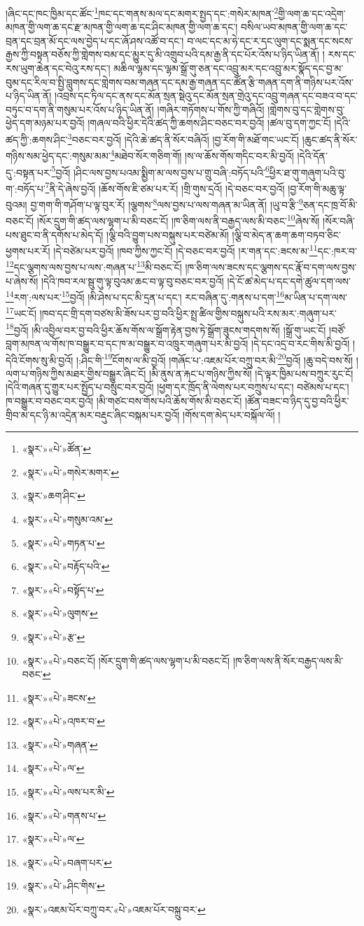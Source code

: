 །ཞིང་དང་ཁང་ཁྱིམ་དང་ཚོང་\footnote{«སྣར་»«པེ་»ཚོན་}ཁང་དང་གནས་མལ་དང་མགར་སྤྱད་དང་:གསེར་མཁན་\footnote{«སྣར་»«པེ་»གསེར་མགར་}གྱི་ལག་ཆ་དང་འདྲེག་མཁན་གྱི་ལག་ཆ་དང་རྫ་མཁན་གྱི་ལག་ཆ་དང་ཤིང་མཁན་གྱི་ལག་ཆ་དང་། བསིལ་ཡབ་མཁན་གྱི་ལག་ཆ་དང་བྲན་དང་བྲན་མོ་དང་ལས་བྱེད་པ་དང་ཞོ་ཤས་འཚོ་བ་དང་། བ་ལང་དང་མ་ཧེ་དང་ར་དང་ལུག་དང་སྨན་དང་སངས་རྒྱས་ཀྱི་བསྟན་བཅོས་ཀྱི་གླེགས་བམ་དང་མྱུར་དུ་མི་འགྲུབ་པའི་དམ་རྒྱ་ནི་དང་པོར་འོས་པ་ཉིད་ཡིན་ནོ། །
རས་དང་རས་ཡུག་ཆེན་དང་བེའུ་རས་དང་། མཆིལ་ལྷམ་དང་ལྷམ་སྒྲོ་གུ་ཅན་དང་འབྲུ་མར་དང་འབྲུ་མར་སྣོད་དང་བྱ་མ་བུམ་དང་རིལ་བ་སྤྱི་བླུགས་དང་གླེགས་བམ་གཞན་དང་དམ་རྒྱ་གཞན་དང་ཚོན་རྩི་གཞན་དག་ནི་གཉིས་པར་འོས་པ་ཉིད་ཡིན་ནོ། །འབྲས་དང་ཏིལ་དང་ནས་དང་མོན་སྲན་སྡེའུ་དང་མོན་སྲན་གྲེའུ་དང་འབྲུ་གཞན་དང་བཟའ་བ་དང་བཏུང་བ་དག་ནི་གསུམ་པར་འོས་པ་ཉིད་ཡིན་ནོ། །གཞིར་གཏོགས་པ་གོས་ཀྱི་གཞིའོ། །གླེགས་བུ་དང་གླེགས་བུ་ཕྱེད་དག་མཉམ་པར་བྱའོ། །གཞལ་བའི་ཕྱིར་དེའི་ཚད་ཀྱི་ཆགས་ཤིང་བཅང་བར་བྱའོ། །ཚལ་བུ་དག་ཀྱང་ངོ། །དེའི་ཚད་ཀྱི་:ཆགས་ཤིང་\footnote{«སྣར་»ཆག་ཤིང་}བཅང་བར་བྱའོ། །དེའི་ཆེ་ཚད་ནི་སོར་བཞིའོ། །བྱ་རོག་གི་མཐོ་གང་ཡང་ངོ། །ཆུང་ཚད་ནི་སོར་གཉིས་སམ་ཕྱེད་དང་:གསུམ་མམ་\footnote{«སྣར་»«པེ་»གསུམ་འམ་}མཐེབ་སོར་གཅིག་གོ། །ས་ལ་ཆོས་གོས་གདིང་བར་མི་བྱའོ། །དེའི་དོན་དུ་:བསྟན་པར་\footnote{«སྣར་»«པེ་»གཏན་པ་}བྱའོ། །ཤིང་ལས་བྱས་པའམ་སྨྱིག་མ་ལས་བྱས་པ་གྲུ་བཞི་:བཏོད་པའི་\footnote{«སྣར་»«པེ་»བརྟོད་པའི་}ཕྱིར་ཐ་གུ་གཞུག་པའི་བུ་ག་:བཏོད་པ་\footnote{«སྣར་»«པེ་»བསྟོད་པ་}ནི་དེ་ཞེས་བྱའོ། །ཆོས་གོས་ཇི་ཙམ་པར་རོ། །གྲི་གུས་དྲའོ། །དེ་བཅང་བར་བྱའོ། །བྱ་རོག་གི་མཆུ་ལྟ་བུའམ། བྱ་གག་གི་གཤོག་པ་ལྟ་བུར་རོ། །ལྕགས་\footnote{«སྣར་»«པེ་»ལུགས་}ལས་བྱས་པ་ལས་གཞན་མ་ཡིན་ནོ། །ཡུ་བ་རྩི་\footnote{«སྣར་»«པེ་»རྩ་}ཅན་དང་ཁྲ་བོ་མི་བཅང་ངོ། །སོར་དྲུག་གི་ཚད་ལས་ལྷག་པ་མི་བཅང་ངོ། །ཁ་ཅིག་ལས་ནི་བརྒྱད་ལས་མི་བཅང་\footnote{«སྣར་»«པེ་»བཅང་ངོ། །སོར་དྲུག་གི་ཚད་ལས་ལྷག་པ་མི་བཅང་ངོ། །ཁ་ཅིག་ལས་ནི་སོར་བརྒྱད་ལས་མི་བཅང་}ཞེས་སོ། །སོར་བཞི་པས་ཐུང་བ་ནི་དགོས་པ་མེད་དོ། །ལྕི་བའི་བྱུག་པས་བསྐུས་པར་བཙེམ་མོ། །ལྕི་བ་མེད་ན་ཆག་ཆག་བཏབ་ཅིང་ཕྱགས་པར་རོ། །དེ་བཙེམ་པར་བྱའོ། །ཁབ་ཀྱིས་ཀྱང་ངོ། །དེ་བཅང་བར་བྱའོ། །ར་གན་དང་:ཟངས་མ་\footnote{«སྣར་»«པེ་»ཟངས་}དང་:ཁར་བ་\footnote{«སྣར་»«པེ་»འཁར་བ་}དང་ལྕགས་ལས་བྱས་པ་ལས་:གཞན་པ་\footnote{«སྣར་»«པེ་»གཞན་}མི་བཅང་ངོ། །ཁ་ཅིག་ལས་ཟངས་དང་ལྕགས་དང་རྣོ་བ་དག་ལས་བྱས་པ་ཞེས་སོ། །དེའི་ཁབ་རལ་སྦུ་གུ་ལྟ་བུའམ་ཆང་བ་ལྟ་བུ་བཅང་བར་བྱའོ། །དེ་ངོ་ཚ་མེད་པ་དང་དགེ་ཚུལ་དག་ལས་\footnote{«སྣར་»«པེ་»ལ་}རག་:ལས་པར་\footnote{«སྣར་»«པེ་»ལས་པར་མི་}བྱའོ། །མི་ཤེས་པ་དང་མི་དྲན་པ་དང་། རང་བཞིན་དུ་:གནས་པ་དག་\footnote{«སྣར་»«པེ་»གནས་པ་}མ་ཡིན་པ་དག་ལས་\footnote{«སྣར་»«པེ་»ལ་}ཡང་ངོ། །ཁབ་དང་གྲི་དག་བཙས་མི་ཟོས་པར་བྱ་བའི་ཕྱིར་སྤྲ་ཚིལ་གྱིས་བསྐུས་པའི་རས་མར་:གཞུག་པར་\footnote{«སྣར་»«པེ་»བཞག་པར་}བྱའོ། །མི་འབྱིལ་བར་བྱ་བའི་ཕྱིར་ཆོས་གོས་ལ་སྒྲོག་རྟེན་བྱས་ཏེ་སྒྲོག་ཟུངས་གདགས་སོ། །སྒྲོ་གུ་ཡང་ངོ། །བཙོ་བླག་མཁན་ལ་གོས་ཁ་བསྒྱུར་བ་དང་ཁ་མ་བསྒྱུར་བ་འཁྲུར་གཞུག་པར་མི་བྱའོ། །དེ་དང་འདྲ་བ་རང་གིས་མི་བྱའོ། །དེའི་ངོགས་སུ་མི་བྱའོ། །:ཤིང་གི་\footnote{«སྣར་»«པེ་»ཤིང་གིས་}ངོགས་ལ་མི་བྱའོ། །གཞོང་པ་:འཇམ་པོར་བཀྲུ་བར་མི་\footnote{«སྣར་»འཇམ་པོར་བཀྲུ་བར་«པེ་»འཇམ་པོར་བསྐྲུ་བར་}བྱའོ། །ཆུ་བདེ་བས་སོ། །ལག་པ་གཉིས་ཀྱིས་མཐར་གྱིས་བསྒྱུར་ཞིང་ངོ། །མི་ནུས་ན་རྐང་པ་གཉིས་ཀྱིས་སོ། །དེ་ལྟར་ཁྱིམ་པས་བཀྲུར་རུང་ངོ། །དེའི་གཞན་དུ་གྱུར་པར་སྤྱོད་པ་བསྲུང་བར་བྱའོ། །ཕྱག་དར་ཁྲོད་ནི་ལེགས་པར་བཀྲུས་པ་དང་། བཙེམས་པ་དང་། ཁ་བསྒྱུར་བ་བཅང་བར་བྱའོ། །མི་གཙང་བས་གོས་པའི་ཆོས་གོས་མི་བཅང་ངོ། །ཚོན་བཟང་བ་ཉིད་དུ་བྱ་བའི་ཕྱིར་གྲིབ་མ་དང་ཉི་མ་འདྲེན་མར་བརྡུང་ཞིང་བསྐམ་པར་བྱའོ། །གོས་དག་མེད་པར་བསྐོལ་ལོ། །
